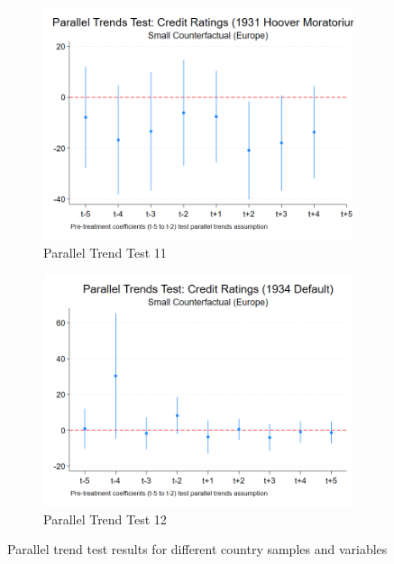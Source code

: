 \begin{figure}[ht!]
\begin{subfigure}[b]{0.48\textwidth}
        \centering
        \includegraphics[width=\textwidth]{figures/PT_Ratings_1931.png}
        \caption{Parallel Trend Test 11}
        \label{fig:pt11}
    \end{subfigure}
    \hfill
    \begin{subfigure}[b]{0.48\textwidth}
        \centering
        \includegraphics[width=\textwidth]{figures/PT_Ratings_1934.png}
        \caption{Parallel Trend Test 12}
        \label{fig:pt12}
    \end{subfigure}
    \caption{Parallel trend test results for different country samples and variables}
    \label{fig:parallel_trends2}
\end{figure}

